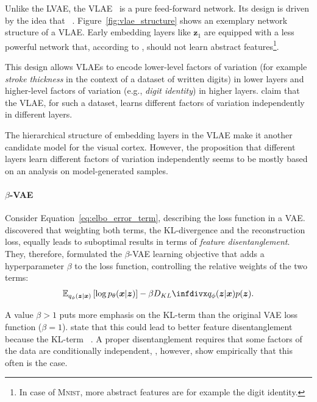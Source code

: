 Unlike the \ac{LVAE}, the \ac{VLAE}~\citep{zhao2017learning} is a pure feed-forward network.
Its design is driven by the idea that ~\citep{zhao2017learning}.
Figure~\ref{fig:vlae_structure} shows an exemplary network structure of a \ac{VLAE}.
Early embedding layers like $\bm{z}_1$ are equipped with a less powerful network that, according to \citet{zhao2017learning}, should not learn abstract features\footnote{In case of \textsc{Mnist}, more abstract features are for example the digit identity.}.

This design allows \acp{VLAE} to encode lower-level factors of variation (for example \textit{stroke thickness} in the context of a dataset of written digits) in lower layers and higher-level factors of variation (e.g., \textit{digit identity}) in higher layers.
\citet{zhao2017learning} claim that the \ac{VLAE}, for such a dataset, learns different factors of variation independently in different layers.

The hierarchical structure of embedding layers in the \ac{VLAE} make it another candidate model for the visual cortex.
However, the proposition that different layers learn different factors of variation independently seems to be mostly based on an analysis on model-generated samples.

\paragraph{$\beta$-VAE}

Consider Equation~\ref{eq:elbo_error_term}, describing the loss function in a \ac{VAE}.
\citet{higgins2017beta} discovered that weighting both terms, the KL-divergence and the reconstruction loss, equally leads to suboptimal results in terms of \textit{feature disentanglement}.
They, therefore, formulated the $\beta$-VAE learning objective that adds a hyperparameter $\beta$ to the loss function, controlling the relative weights of the two terms:
\begin{align}
    \mathbb{E}_{q_{\phi}(\bm{z} | \bm{x})}\left[\log p_{\theta}(\bm{x} | \bm{z})\right]-\beta \kldiv{q_{\phi}(\bm{z} | \bm{x})}{p(\bm{z})}. \label{eq:beta-vae}
\end{align}

A value $\beta > 1$ puts more emphasis on the KL-term than the original \ac{VAE} loss function ($\beta = 1$).
\citet{higgins2017beta} state that this could lead to better feature disentanglement because the KL-term ~\citep{higgins2017beta}.
A proper disentanglement requires that some factors of the data are conditionally independent, \citet{higgins2017beta}, however, show empirically that this often is the case.

